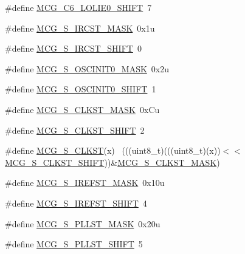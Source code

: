 \begin{DoxyCompactItemize}
\item 
\#define \hyperlink{group___m_c_g___register___masks_gaf62eb94fa38802a5950bd616b539a69c}{M\+C\+G\+\_\+\+C6\+\_\+\+L\+O\+L\+I\+E0\+\_\+\+S\+H\+I\+FT}~7
\item 
\#define \hyperlink{group___m_c_g___register___masks_ga1c693472984fb69650b117ffe5b76da5}{M\+C\+G\+\_\+\+S\+\_\+\+I\+R\+C\+S\+T\+\_\+\+M\+A\+SK}~0x1u
\item 
\#define \hyperlink{group___m_c_g___register___masks_ga9abb1ad8f00a085572bb58ab815b7afd}{M\+C\+G\+\_\+\+S\+\_\+\+I\+R\+C\+S\+T\+\_\+\+S\+H\+I\+FT}~0
\item 
\#define \hyperlink{group___m_c_g___register___masks_ga75a97c37fbe3689889ea81fd04f13805}{M\+C\+G\+\_\+\+S\+\_\+\+O\+S\+C\+I\+N\+I\+T0\+\_\+\+M\+A\+SK}~0x2u
\item 
\#define \hyperlink{group___m_c_g___register___masks_ga3680bc3a628991bb5279d9d6b938b374}{M\+C\+G\+\_\+\+S\+\_\+\+O\+S\+C\+I\+N\+I\+T0\+\_\+\+S\+H\+I\+FT}~1
\item 
\#define \hyperlink{group___m_c_g___register___masks_gaf43507c78cdda211a04b5ae0509edb2e}{M\+C\+G\+\_\+\+S\+\_\+\+C\+L\+K\+S\+T\+\_\+\+M\+A\+SK}~0x\+Cu
\item 
\#define \hyperlink{group___m_c_g___register___masks_gab0768a667adb2dc2e1fb7972f9fd85a4}{M\+C\+G\+\_\+\+S\+\_\+\+C\+L\+K\+S\+T\+\_\+\+S\+H\+I\+FT}~2
\item 
\#define \hyperlink{group___m_c_g___register___masks_gabb753abc57dbb658ff413c418d8b68c8}{M\+C\+G\+\_\+\+S\+\_\+\+C\+L\+K\+ST}(x)                                                  ~(((uint8\+\_\+t)(((uint8\+\_\+t)(x))$<$$<$\hyperlink{group___m_c_g___register___masks_gab0768a667adb2dc2e1fb7972f9fd85a4}{M\+C\+G\+\_\+\+S\+\_\+\+C\+L\+K\+S\+T\+\_\+\+S\+H\+I\+FT}))\&\hyperlink{group___m_c_g___register___masks_gaf43507c78cdda211a04b5ae0509edb2e}{M\+C\+G\+\_\+\+S\+\_\+\+C\+L\+K\+S\+T\+\_\+\+M\+A\+SK})
\item 
\#define \hyperlink{group___m_c_g___register___masks_ga5bf822a90d9c1e67d5297420157e1dd0}{M\+C\+G\+\_\+\+S\+\_\+\+I\+R\+E\+F\+S\+T\+\_\+\+M\+A\+SK}~0x10u
\item 
\#define \hyperlink{group___m_c_g___register___masks_ga4a2727883c339845e709dacc0c2fd71a}{M\+C\+G\+\_\+\+S\+\_\+\+I\+R\+E\+F\+S\+T\+\_\+\+S\+H\+I\+FT}~4
\item 
\#define \hyperlink{group___m_c_g___register___masks_ga6f176d95968a5b7b1af67ae81734c854}{M\+C\+G\+\_\+\+S\+\_\+\+P\+L\+L\+S\+T\+\_\+\+M\+A\+SK}~0x20u
\item 
\#define \hyperlink{group___m_c_g___register___masks_gafddddab311f8f0cb58e7b7941f6d9a8d}{M\+C\+G\+\_\+\+S\+\_\+\+P\+L\+L\+S\+T\+\_\+\+S\+H\+I\+FT}~5
$$
\end{DoxyCompactItemize}
